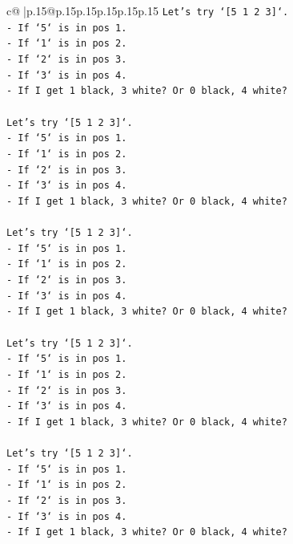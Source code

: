\documentclass{article}
\begin{document}
{\begin{supertabular}{c@{$\;$}|p{.15\linewidth}@{}p{.15\linewidth}p{.15\linewidth}p{.15\linewidth}p{.15\linewidth}p{.15\linewidth}}
{{{\texttt{Let's try `{[}5 1 2 3{]}`.} \\
\texttt{{-} If `5` is in pos 1.} \\
\texttt{{-} If `1` is in pos 2.} \\
\texttt{{-} If `2` is in pos 3.} \\
\texttt{{-} If `3` is in pos 4.} \\
\texttt{{-} If I get 1 black, 3 white? Or 0 black, 4 white?} \\
\\ 
\texttt{Let's try `{[}5 1 2 3{]}`.} \\
\texttt{{-} If `5` is in pos 1.} \\
\texttt{{-} If `1` is in pos 2.} \\
\texttt{{-} If `2` is in pos 3.} \\
\texttt{{-} If `3` is in pos 4.} \\
\texttt{{-} If I get 1 black, 3 white? Or 0 black, 4 white?} \\
\\ 
\texttt{Let's try `{[}5 1 2 3{]}`.} \\
\texttt{{-} If `5` is in pos 1.} \\
\texttt{{-} If `1` is in pos 2.} \\
\texttt{{-} If `2` is in pos 3.} \\
\texttt{{-} If `3` is in pos 4.} \\
\texttt{{-} If I get 1 black, 3 white? Or 0 black, 4 white?} \\
\\ 
\texttt{Let's try `{[}5 1 2 3{]}`.} \\
\texttt{{-} If `5` is in pos 1.} \\
\texttt{{-} If `1` is in pos 2.} \\
\texttt{{-} If `2` is in pos 3.} \\
\texttt{{-} If `3` is in pos 4.} \\
\texttt{{-} If I get 1 black, 3 white? Or 0 black, 4 white?} \\
\\ 
\texttt{Let's try `{[}5 1 2 3{]}`.} \\
\texttt{{-} If `5` is in pos 1.} \\
\texttt{{-} If `1` is in pos 2.} \\
\texttt{{-} If `2` is in pos 3.} \\
\texttt{{-} If `3` is in pos 4.} \\
\texttt{{-} If I get 1 black, 3 white? Or 0 black, 4 white?} \\
}}}
\end{supertabular}}
\end{document}
